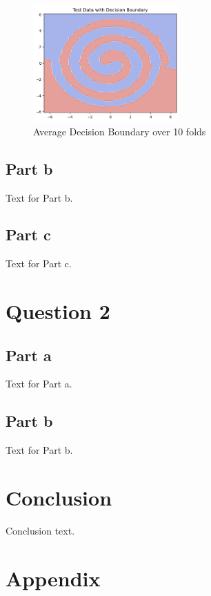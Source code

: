 \documentclass[runningheads]{llncs}
\begin{document}
\begin{figure}[!htb]
  \centering
  \includegraphics[width=0.5\textwidth]{Question1Images/1AFinalFFNNOutput.png}
  \caption{Average Decision Boundary over 10 folds}
  \label{fig:FirstFFNNDecision}
\end{figure}

\subsection{Part b}

Text for Part b.

\subsection{Part c}

Text for Part c.

\section{Question 2}

\subsection{Part a}

Text for Part a.

\subsection{Part b}

Text for Part b.

\section{Conclusion}

Conclusion text.

\pagebreak
\appendix
\section{Appendix}
\end{document}
